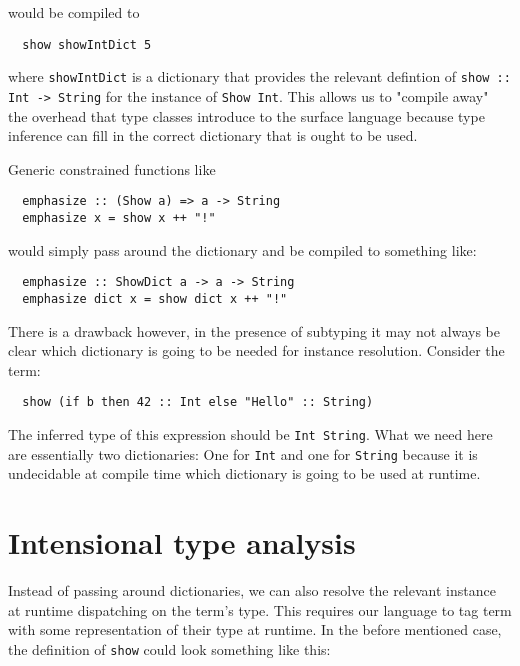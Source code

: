 would be compiled to

\begin{verbatim}
  show showIntDict 5
\end{verbatim}

where \texttt{showIntDict} is a dictionary that provides the relevant defintion of \texttt{show :: Int -> String} for the instance of \texttt{Show Int}.
This allows us to "compile away" the overhead that type classes introduce to the surface language because type inference can fill in the correct dictionary that is ought to be used.

Generic constrained functions like

\begin{verbatim}
  emphasize :: (Show a) => a -> String
  emphasize x = show x ++ "!"
\end{verbatim}

would simply pass around the dictionary and be compiled to something like:

\begin{verbatim}
  emphasize :: ShowDict a -> a -> String
  emphasize dict x = show dict x ++ "!"
\end{verbatim}

\cite{kiselyov}

There is a drawback however, in the presence of subtyping it may not always be clear which dictionary is going to be needed for instance resolution.
Consider the term:

\begin{verbatim}
  show (if b then 42 :: Int else "Hello" :: String)
\end{verbatim}

The inferred type of this expression should be \texttt{Int \/ String}.
What we need here are essentially two dictionaries: One for \texttt{Int} and one for \texttt{String} because it is undecidable at compile time which dictionary is going to be used at runtime.

\section{Intensional type analysis}

Instead of passing around dictionaries, we can also resolve the relevant instance at runtime dispatching on the term's type.
This requires our language to tag term with some representation of their type at runtime.
In the before mentioned case, the definition of \texttt{show} could look something like this:

